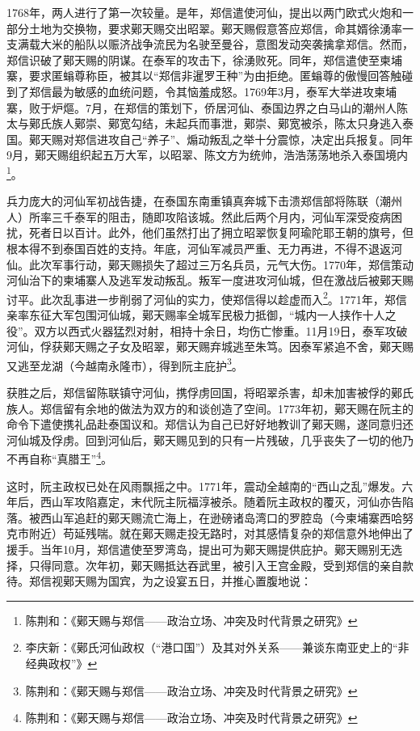 1768年，两人进行了第一次较量。是年，郑信遣使河仙，提出以两门欧式火炮和一部分土地为交换物，要求鄚天赐交出昭翠。鄚天赐假意答应郑信，命其婿徐湧率一支满载大米的船队以赈济战争流民为名驶至曼谷，意图发动突袭擒拿郑信。然而，郑信识破了鄚天赐的阴谋。在泰军的攻击下，徐湧败死。同年，郑信遣使至柬埔寨，要求匿螉尊称臣，被其以“郑信非暹罗王种”为由拒绝。匿螉尊的傲慢回答触碰到了郑信最为敏感的血统问题，令其恼羞成怒。1769年3月，泰军大举进攻柬埔寨，败于炉熰。7月，在郑信的策划下，侨居河仙、泰国边界之白马山的潮州人陈太与鄚氏族人鄚崇、鄚宽勾结，未起兵而事泄，鄚崇、鄚宽被杀，陈太只身逃入泰国。鄚天赐对郑信进攻自己“养子”、煽动叛乱之举十分震惊，决定出兵报复。同年9月，鄚天赐组织起五万大军，以昭翠、陈文方为统帅，浩浩荡荡地杀入泰国境内\footnote{陈荆和：《鄚天赐与郑信——政治立场、冲突及时代背景之研究》}。

兵力庞大的河仙军初战告捷，在泰国东南重镇真奔城下击溃郑信部将陈联（潮州人）所率三千泰军的阻击，随即攻陷该城。然此后两个月内，河仙军深受疫病困扰，死者日以百计。此外，他们虽然打出了拥立昭翠恢复阿瑜陀耶王朝的旗号，但根本得不到泰国百姓的支持。年底，河仙军减员严重、无力再进，不得不退返河仙。此次军事行动，鄚天赐损失了超过三万名兵员，元气大伤。1770年，郑信策动河仙治下的柬埔寨人及逃军发动叛乱。叛军一度进攻河仙城，但在激战后被鄚天赐讨平。此次乱事进一步削弱了河仙的实力，使郑信得以趁虚而入\footnote{李庆新：《鄚氏河仙政权（“港口国”）及其对外关系——兼谈东南亚史上的“非经典政权”》}。1771年，郑信亲率东征大军包围河仙城，鄚天赐率全城军民极力抵御，“城内一人挟作十人之役”。双方以西式火器猛烈对射，相持十余日，均伤亡惨重。11月19日，泰军攻破河仙，俘获鄚天赐之子女及昭翠，鄚天赐弃城逃至朱笃。因泰军紧追不舍，鄚天赐又逃至龙湖（今越南永隆市），得到阮主庇护\footnote{陈荆和：《鄚天赐与郑信——政治立场、冲突及时代背景之研究》}。 

获胜之后，郑信留陈联镇守河仙，携俘虏回国，将昭翠杀害，却未加害被俘的鄚氏族人。郑信留有余地的做法为双方的和谈创造了空间。1773年初，鄚天赐在阮主的命令下遣使携礼品赴泰国议和。郑信认为自己已好好地教训了鄚天赐，遂同意归还河仙城及俘虏。回到河仙后，鄚天赐见到的只有一片残破，几乎丧失了一切的他乃不再自称“真腊王”\footnote{陈荆和：《鄚天赐与郑信——政治立场、冲突及时代背景之研究》}。

这时，阮主政权已处在风雨飘摇之中。1771年，震动全越南的“西山之乱”爆发。六年后，西山军攻陷嘉定，末代阮主阮福淳被杀。随着阮主政权的覆灭，河仙亦告陷落。被西山军追赶的鄚天赐流亡海上，在逊磅诸岛湾口的罗腔岛（今柬埔寨西哈努克市附近）苟延残喘。就在鄚天赐走投无路时，对其感情复杂的郑信意外地伸出了援手。当年10月，郑信遣使至罗湾岛，提出可为鄚天赐提供庇护。鄚天赐别无选择，只得同意。次年初，鄚天赐抵达吞武里，被引入王宫金殿，受到郑信的亲自款待。郑信视鄚天赐为国宾，为之设宴五日，并推心置腹地说：

